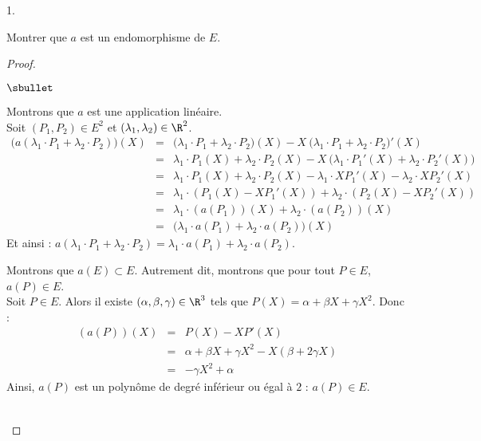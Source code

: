 \documentclass[11pt]{article}%
\begin{document}
\begin{noliste}{1.}
  \setlength{\itemsep}{2mm}
\item Montrer que $a$ est un endomorphisme de $E$.
  
  \begin{proof}~
    \begin{noliste}{$\sbullet$}
    \item Montrons que $a$ est une application linéaire.\\
      Soit $(P_1,P_2)\in E^2$ et $(\lambda_1,\lambda_2)\in\R^2$.
      \[
      \begin{array}{rcl}
        \big(a(\lambda_1 \cdot P_1+ \lambda_2 \cdot P_2)\big)(X) & =
        & \big(\lambda_1 \cdot P_1+\lambda_2 \cdot P_2\big)(X) -
        X \ \big(\lambda_1 \cdot P_1+\lambda_2 \cdot P_2 \big)'(X)
        \\[.2cm]
        & = & \lambda_1 \cdot P_1(X) + \lambda_2 \cdot P_2(X)
        -X \ \big(\lambda_1 \cdot P_1'(X) + \lambda_2 \cdot P_2'(X)\big)
        \\[.2cm] 
        & = & \lambda_1 \cdot P_1(X)+\lambda_2 \cdot P_2(X)-\lambda_1 \cdot 
        XP_1'(X) - \lambda_2 \cdot X 
        P_2'(X)
        \\[.2cm]
        & = & \lambda_1 \cdot (P_1(X)-XP_1'(X))+\lambda_2 \cdot(P_2(X)-XP_2'(X))
        \\[.2cm]
        & = & \lambda_1 \cdot (a(P_1))(X)+ \lambda_2 \cdot (a(P_2))(X)
        \\[.2cm]
        & = & \big(\lambda_1 \cdot a(P_1)+ \lambda_2 \cdot a(P_2) \big)(X)
      \end{array}
      \]
      Et ainsi : $a(\lambda_1 \cdot P_1+ \lambda_2 \cdot P_2) =
      \lambda_1 \cdot a(P_1)+ \lambda_2 \cdot a(P_2)$.
      
    \item Montrons que $a(E)\subset E$. Autrement dit, montrons que
      pour
      tout $P\in E$, $a(P)\in E$.\\
      Soit $P\in E$. Alors il existe $(\alpha,\beta,\gamma)\in\R^3$
      tels que $P(X)=\alpha+\beta X+\gamma X^2$. Donc :
      \[
      \begin{array}{rcl}
        (a(P))(X) & = & P(X)-XP'(X)
        \\[.2cm]
        & = & \alpha +\beta X+\gamma X^2 -X(\beta +2\gamma X)
        \\[.2cm]
        & = & -\gamma X^2 + \alpha
      \end{array}
      \]
      Ainsi, $a(P)$ est un polynôme de degré inférieur ou égal à $2$ :
      $a(P)\in E$.
    \end{noliste}
    ~\\[-1.2cm]
  \end{proof}



\end{noliste}
\end{document}
